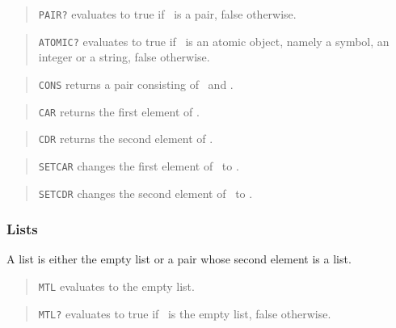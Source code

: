 \bigskip


\begin{quote}
	{\tt PAIR?} evaluates to true if \obj\ is a pair, false otherwise.
\end{quote}

\begin{quote}
	{\tt ATOMIC?} evaluates to true if \obj\ is an atomic object, namely
	a symbol, an integer or a string, false otherwise.
\end{quote}

\begin{quote}
	{\tt CONS} returns a pair consisting of \objone\ and \objtwo.
\end{quote}

\begin{quote}
	{\tt CAR} returns the first element of \pair.
\end{quote}

\begin{quote}
	{\tt CDR} returns the second element of \pair.
\end{quote}

\begin{quote}
	{\tt SETCAR} changes the first element of \pair\ to \obj.
\end{quote}

\begin{quote}
	{\tt SETCDR} changes the second element of \pair\ to \obj.
\end{quote}


\subsubsection{Lists}

A list is either the empty list or a pair whose second element is a list.

\bigskip

\begin{quote}
	{\tt MTL} evaluates to the empty list.
\end{quote}

\begin{quote}
	{\tt MTL?} evaluates to true if \obj\ is the empty list, false otherwise.
\end{quote}

